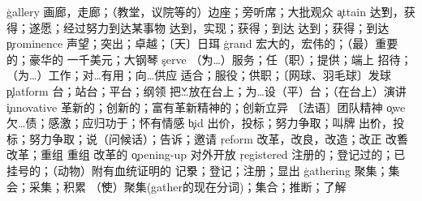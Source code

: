 \begin{multicols}{2}
\c{gallery}  \n 画廊，走廊；（教堂，议院等的）边座；旁听席；大批观众
\c{attain}  \v 达到，获得；遂愿；经过努力到达某事物 \vt 达到，实现；获得；到达 \vi 达到；获得；到达
\c{prominence}  \n 声望；突出；卓越；〔天〕日珥
\c{grand}  \a 宏大的，宏伟的；（最）重要的；豪华的 \n 一千美元；大钢琴
\c{serve}  \v （为…）服务；任（职）；提供；端上 \vt 招待；（为…）工作；对…有用；向…供应 \vi 适合；服役；供职；〔网球、羽毛球〕发球
\c{platform}  \n 台；站台；平台；纲领 \v 把…放在台上；为…设（平）台；（在台上）演讲
\c{innovative}  \a 革新的；创新的；富有革新精神的；创新立异
 〔法语〕团队精神
\c{owe}  \vt 欠…债；感激；应归功于；怀有情感
\c{bid}  \n 出价，投标；努力争取；叫牌 \v 出价，投标；努力争取；说（问候话）；告诉；邀请
\c{reform}  \n 改革，改良，改造；改正 \v 改善 \vt 改革；重组 \vi 重组 \a 改革的
\c{opening-up}  \n 对外开放
\c{registered}  \a 注册的；登记过的；已挂号的；（动物）附有血统证明的 \v 记录；登记；注册；显出
\c{gathering}  \n 聚集；集会；采集；积累 \v （使）聚集(gather的现在分词)；集合；推断；了解
\end{multicols}


